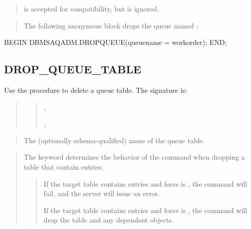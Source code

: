 \documentclass[letterpaper,10pt,english,openany,oneside]{sphinxmanual}
\begin{document}
\begin{quote}

 is accepted for compatibility, but is ignored.
\end{quote}

\begin{quote}

The following anonymous block drops the queue named :
\end{quote}

%
\begin{sphinxVerbatim}[commandchars=\\\{\}]
BEGIN
DBMS\PYGZus{}AQADM.DROP\PYGZus{}QUEUE(queue\PYGZus{}name =\PYGZgt{} \PYGZsq{}work\PYGZus{}order\PYGZsq{});
END;
\end{sphinxVerbatim}

\newpage


\subsection{DROP\_QUEUE\_TABLE}
\label{\detokenize{drop_queue_table::doc}}\label{\detokenize{drop_queue_table:drop-queue-table}}
Use the  procedure to delete a queue table. The
signature is:
\begin{quote}

\begin{quote}

,

,

\end{quote}
\end{quote}


\begin{quote}

The (optionally schema-qualified) name of the queue table.
\end{quote}

\begin{quote}

The  keyword determines the behavior of the
 command when dropping a table that contain
entries:
\begin{quote}

If the target table contains entries and force is , the command
will fail, and the server will issue an error.

If the target table contains entries and force is , the command
will drop the table and any dependent objects.
\end{quote}
\end{quote}
\end{document}
